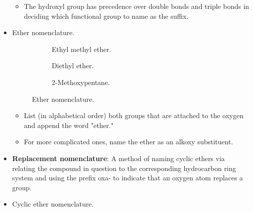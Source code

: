 \documentclass[../notes.tex]{subfiles}
\begin{document}
\begin{itemize}
\begin{itemize}
        \item The hydroxyl group has precedence over double bonds and triple bonds in deciding which functional group to name as the suffix.
    \end{itemize}
    \item Ether nomenclature.
    \begin{figure}[h!]
        \centering
        \footnotesize
        \begin{subfigure}[b]{0.33\linewidth}
            \centering
            \vspace{1em}
            \caption{Ethyl methyl ether.}
            \label{fig:etherNomenclaturea}
        \end{subfigure}
        \begin{subfigure}[b]{0.32\linewidth}
            \centering
            \vspace{1em}
            \caption{Diethyl ether.}
            \label{fig:etherNomenclatureb}
        \end{subfigure}
        \begin{subfigure}[b]{0.33\linewidth}
            \centering
            \vspace{1em}
            \caption{2-Methoxypentane.}
            \label{fig:etherNomenclaturec}
        \end{subfigure}
        \caption{Ether nomenclature.}
        \label{fig:etherNomenclature}
    \end{figure}
    \begin{itemize}
        \item List (in alphabetical order) both groups that are attached to the oxygen and append the word "ether."
        \item For more complicated ones, name the ether as an alkoxy substituent.
    \end{itemize}
    \item \textbf{Replacement nomenclature}: A method of naming cyclic ethers via relating the compound in question to the corresponding hydrocarbon ring system and using the prefix oxa- to indicate that an oxygen atom replaces a  group.
    \item Cyclic ether nomenclature.
    \begin{figure}[H]
        \centering
        \footnotesize
        \captionsetup{justification=centering}
        \begin{subfigure}[b]{0.24\linewidth}

\end{subfigure}
\end{figure}
\end{itemize}
\end{document}
